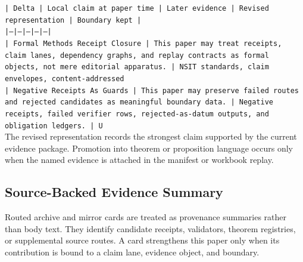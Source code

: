 \documentclass[11pt]{article}
\begin{document}
\noindent\texttt{| Delta | Local claim at paper time | Later evidence | Revised representation | Boundary kept |}\\
\noindent\texttt{|---|---|---|---|---|}\\
\noindent\texttt{| Formal Methods Receipt Closure | This paper may treat receipts, claim lanes, dependency graphs, and replay contracts as formal objects, not mere editorial apparatus. | NSIT standards, claim envelopes, content-addressed}\\
\noindent\texttt{| Negative Receipts As Guards | This paper may preserve failed routes and rejected candidates as meaningful boundary data. | Negative receipts, failed verifier rows, rejected-as-datum outputs, and obligation ledgers. | U}\\

The revised representation records the strongest claim supported by the current evidence package. Promotion into theorem or proposition language occurs only when the named evidence is attached in the manifest or workbook replay.

\subsection*{Source-Backed Evidence Summary}

Routed archive and mirror cards are treated as provenance summaries rather than
body text. They identify candidate receipts, validators, theorem registries, or
supplemental source routes. A card strengthens this paper only when its
contribution is bound to a claim lane, evidence object, and boundary.
\end{document}

